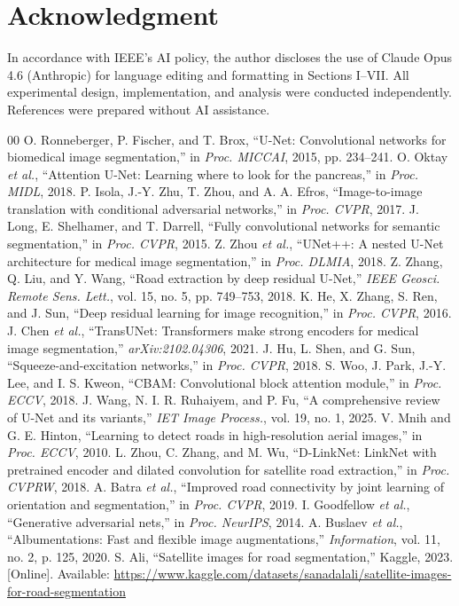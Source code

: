 \documentclass[conference]{IEEEtran}
\begin{document}
\section*{Acknowledgment}

In accordance with IEEE's AI policy, the author discloses the use of Claude Opus 4.6 (Anthropic) for language editing and formatting in Sections I--VII. All experimental design, implementation, and analysis were conducted independently. References were prepared without AI assistance.

\begin{thebibliography}{00}
 O. Ronneberger, P. Fischer, and T. Brox, ``U-Net: Convolutional networks for biomedical image segmentation,'' in \emph{Proc. MICCAI}, 2015, pp. 234--241.
 O. Oktay \emph{et al.}, ``Attention U-Net: Learning where to look for the pancreas,'' in \emph{Proc. MIDL}, 2018.
 P. Isola, J.-Y. Zhu, T. Zhou, and A. A. Efros, ``Image-to-image translation with conditional adversarial networks,'' in \emph{Proc. CVPR}, 2017.
 J. Long, E. Shelhamer, and T. Darrell, ``Fully convolutional networks for semantic segmentation,'' in \emph{Proc. CVPR}, 2015.
 Z. Zhou \emph{et al.}, ``UNet++: A nested U-Net architecture for medical image segmentation,'' in \emph{Proc. DLMIA}, 2018.
 Z. Zhang, Q. Liu, and Y. Wang, ``Road extraction by deep residual U-Net,'' \emph{IEEE Geosci. Remote Sens. Lett.}, vol. 15, no. 5, pp. 749--753, 2018.
 K. He, X. Zhang, S. Ren, and J. Sun, ``Deep residual learning for image recognition,'' in \emph{Proc. CVPR}, 2016.
 J. Chen \emph{et al.}, ``TransUNet: Transformers make strong encoders for medical image segmentation,'' \emph{arXiv:2102.04306}, 2021.
 J. Hu, L. Shen, and G. Sun, ``Squeeze-and-excitation networks,'' in \emph{Proc. CVPR}, 2018.
 S. Woo, J. Park, J.-Y. Lee, and I. S. Kweon, ``CBAM: Convolutional block attention module,'' in \emph{Proc. ECCV}, 2018.
 J. Wang, N. I. R. Ruhaiyem, and P. Fu, ``A comprehensive review of U-Net and its variants,'' \emph{IET Image Process.}, vol. 19, no. 1, 2025.
 V. Mnih and G. E. Hinton, ``Learning to detect roads in high-resolution aerial images,'' in \emph{Proc. ECCV}, 2010.
 L. Zhou, C. Zhang, and M. Wu, ``D-LinkNet: LinkNet with pretrained encoder and dilated convolution for satellite road extraction,'' in \emph{Proc. CVPRW}, 2018.
 A. Batra \emph{et al.}, ``Improved road connectivity by joint learning of orientation and segmentation,'' in \emph{Proc. CVPR}, 2019.
 I. Goodfellow \emph{et al.}, ``Generative adversarial nets,'' in \emph{Proc. NeurIPS}, 2014.
 A. Buslaev \emph{et al.}, ``Albumentations: Fast and flexible image augmentations,'' \emph{Information}, vol. 11, no. 2, p. 125, 2020.
 S. Ali, ``Satellite images for road segmentation,'' Kaggle, 2023. [Online]. Available: \url{https://www.kaggle.com/datasets/sanadalali/satellite-images-for-road-segmentation}
\end{thebibliography}
\end{document}
